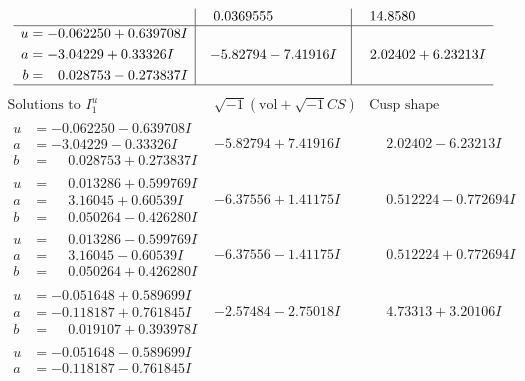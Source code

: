 \documentclass[1p]{elsarticle_modified}
\theoremstyle{definition}
\newcommand{\I}{\sqrt{-1}}
\begin{document}
$$\begin{array}{c|c|c}
 & \phantom{-}0.0369555\phantom{ +0.000000I} & \phantom{-}14.8580\phantom{ +0.000000I} \\ \hline\begin{aligned}
u &= -0.062250 + 0.639708 I \\
a &= -3.04229 + 0.33326 I \\
b &= \phantom{-}0.028753 - 0.273837 I\end{aligned}
 & -5.82794 - 7.41916 I & \phantom{-}2.02402 + 6.23213 I\\
 \hline 
 \end{array}$$\newpage$$\begin{array}{c|c|c}  
\text{Solutions to }I^u_{1}& \I (\text{vol} + \sqrt{-1}CS) & \text{Cusp shape}\\
 \hline 
\begin{aligned}
u &= -0.062250 - 0.639708 I \\
a &= -3.04229 - 0.33326 I \\
b &= \phantom{-}0.028753 + 0.273837 I\end{aligned}
 & -5.82794 + 7.41916 I & \phantom{-}2.02402 - 6.23213 I \\ \hline\begin{aligned}
u &= \phantom{-}0.013286 + 0.599769 I \\
a &= \phantom{-}3.16045 + 0.60539 I \\
b &= \phantom{-}0.050264 - 0.426280 I\end{aligned}
 & -6.37556 + 1.41175 I & \phantom{-}0.512224 - 0.772694 I \\ \hline\begin{aligned}
u &= \phantom{-}0.013286 - 0.599769 I \\
a &= \phantom{-}3.16045 - 0.60539 I \\
b &= \phantom{-}0.050264 + 0.426280 I\end{aligned}
 & -6.37556 - 1.41175 I & \phantom{-}0.512224 + 0.772694 I \\ \hline\begin{aligned}
u &= -0.051648 + 0.589699 I \\
a &= -0.118187 + 0.761845 I \\
b &= \phantom{-}0.019107 + 0.393978 I\end{aligned}
 & -2.57484 - 2.75018 I & \phantom{-}4.73313 + 3.20106 I \\ \hline\begin{aligned}
u &= -0.051648 - 0.589699 I \\
a &= -0.118187 - 0.761845 I \\

\end{aligned}
\end{array}$$
\end{document}
